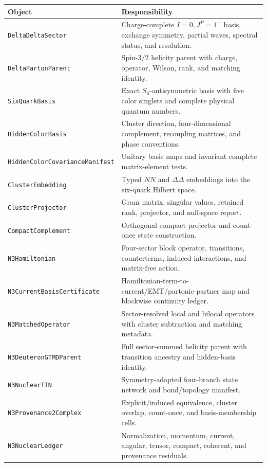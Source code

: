 \documentclass[11pt]{article}
\begin{document}
{\small\begin{longtable}{L{0.36\textwidth}L{0.56\textwidth}}
\toprule
Object & Responsibility \\
\midrule
\endhead
\texttt{DeltaDeltaSector} & Charge-complete \(I=0,J^P=1^+\) basis, exchange symmetry, partial waves, spectral status, and resolution. \\
\texttt{DeltaPartonParent} & Spin-3/2 helicity parent with charge, operator, Wilson, rank, and matching identity. \\
\texttt{SixQuarkBasis} & Exact \(S_6\)-antisymmetric basis with five color singlets and complete physical quantum numbers. \\
\texttt{HiddenColorBasis} & Cluster direction, four-dimensional complement, recoupling matrices, and phase conventions. \\
\texttt{HiddenColorCovarianceManifest} & Unitary basis maps and invariant complete matrix-element tests. \\
\texttt{ClusterEmbedding} & Typed \(NN\) and \(\Delta\Delta\) embeddings into the six-quark Hilbert space. \\
\texttt{ClusterProjector} & Gram matrix, singular values, retained rank, projector, and null-space report. \\
\texttt{CompactComplement} & Orthogonal compact projector and count-once state construction. \\
\texttt{N3Hamiltonian} & Four-sector block operator, transitions, counterterms, induced interactions, and matrix-free action. \\
\texttt{N3CurrentBasisCertificate} & Hamiltonian-term-to-current/EMT/partonic-partner map and blockwise continuity ledger. \\
\texttt{N3MatchedOperator} & Sector-resolved local and bilocal operators with cluster subtraction and matching metadata. \\
\texttt{N3DeuteronGTMDParent} & Full sector-summed helicity parent with transition ancestry and hidden-basis identity. \\
\texttt{N3NuclearTTN} & Symmetry-adapted four-branch state network and bond/topology manifest. \\
\texttt{N3Provenance2Complex} & Explicit/induced equivalence, cluster overlap, count-once, and basis-membership cells. \\
\texttt{N3NuclearLedger} & Normalization, momentum, current, angular, tensor, compact, coherent, and provenance residuals. \\
\bottomrule
\end{longtable}
}
\end{document}
